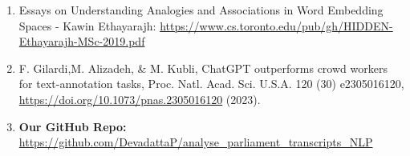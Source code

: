 \documentclass{report}
\begin{document}
\begin{enumerate}
    \item Essays on Understanding Analogies and Associations in Word Embedding Spaces - Kawin Ethayarajh:\label{appendix:embeddings} \url{https://www.cs.toronto.edu/pub/gh/HIDDEN-Ethayarajh-MSc-2019.pdf}
    \item F. Gilardi,M. Alizadeh, \& M. Kubli,  ChatGPT outperforms crowd workers for text-annotation tasks, Proc. Natl. Acad. Sci. U.S.A. 120 (30) e2305016120, \url{https://doi.org/10.1073/pnas.2305016120} (2023)\label{appendix:chatgpt}.
    \item \textbf{Our GitHub Repo:}\label{appendix:github-repo} \url{https://github.com/DevadattaP/analyse_parliament_transcripts_NLP}

\end{enumerate}
\end{document}
